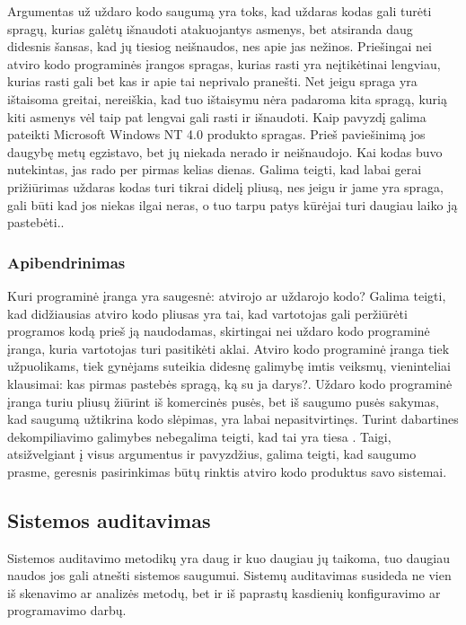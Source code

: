 \documentclass[a4paper,12pt,fleqn]{article}
\begin{document}
Argumentas už uždaro kodo saugumą yra toks, kad uždaras kodas gali turėti spragų, kurias galėtų išnaudoti atakuojantys asmenys, bet atsiranda daug didesnis šansas, kad jų tiesiog neišnaudos, nes apie jas nežinos\cite{ford2007open}.  Priešingai nei atviro kodo programinės įrangos spragas, kurias rasti yra neįtikėtinai lengviau, kurias rasti gali bet kas ir apie tai neprivalo pranešti. Net jeigu spraga yra ištaisoma greitai, nereiškia, kad tuo ištaisymu nėra padaroma kita spragą, kurią kiti asmenys vėl taip pat lengvai gali rasti ir išnaudoti. Kaip pavyzdį galima pateikti Microsoft Windows NT 4.0 produkto spragas. Prieš paviešinimą jos daugybę metų egzistavo, bet jų niekada nerado ir neišnaudojo. Kai kodas buvo nutekintas, jas rado per pirmas kelias dienas\cite{hoepman2008increased}.  Galima teigti, kad labai gerai prižiūrimas uždaras kodas turi tikrai didelį pliusą, nes jeigu ir jame yra spraga, gali būti kad jos niekas ilgai neras, o tuo tarpu patys kūrėjai turi daugiau laiko ją pastebėti.\cite{schryen2009open}.

\subsubsection{Apibendrinimas}
\label{sec:data}
Kuri programinė įranga yra saugesnė: atvirojo ar uždarojo kodo? Galima teigti, kad didžiausias atviro kodo pliusas yra tai, kad vartotojas gali peržiūrėti programos kodą prieš ją naudodamas, skirtingai nei uždaro kodo programinė įranga, kuria vartotojas turi pasitikėti aklai\cite{Cowan:2003:SSO:858866.859050}. Atviro kodo programinė įranga tiek užpuolikams, tiek gynėjams suteikia didesnę galimybę imtis veiksmų, vieninteliai klausimai: kas pirmas pastebės spragą, ką su ja darys?\cite{mishra2002quality}. Uždaro kodo programinė įranga turiu pliusų žiūrint iš komercinės pusės, bet iš saugumo pusės sakymas, kad saugumą užtikrina kodo slėpimas, yra labai nepasitvirtinęs. Turint dabartines dekompiliavimo galimybes nebegalima teigti, kad tai yra tiesa \cite{hoepman2008increased}. Taigi, atsižvelgiant į visus argumentus ir pavyzdžius, galima teigti, kad saugumo prasme, geresnis pasirinkimas būtų rinktis atviro kodo produktus savo sistemai.

\subsection{Sistemos auditavimas}

Sistemos auditavimo metodikų yra daug ir kuo daugiau jų taikoma, tuo daugiau naudos jos gali atnešti sistemos saugumui. Sistemų auditavimas susideda ne vien iš skenavimo ar analizės metodų, bet ir iš paprastų kasdienių konfiguravimo ar programavimo darbų.
\end{document}
